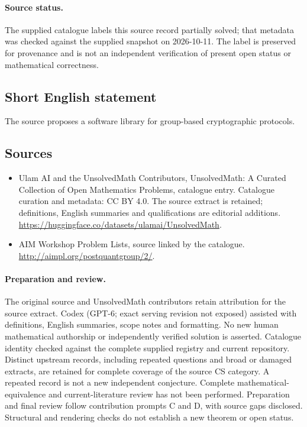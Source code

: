\documentclass[11pt]{article}
\begin{document}
\paragraph{Source status.}
The supplied catalogue labels this source record partially solved; that metadata was checked against the supplied snapshot on 2026-10-11. The label is preserved for provenance and is not an independent verification of present open status or mathematical correctness.
\subsection{Short English statement}
The source proposes a software library for group-based cryptographic protocols.
\subsection{Sources}
\begin{itemize}
\item[\hypertarget{source:statement:1}{S1}] Ulam AI and the UnsolvedMath Contributors, UnsolvedMath: A Curated Collection of Open Mathematics Problems, catalogue entry. Catalogue curation and metadata: CC BY 4.0. The source extract is retained; definitions, English summaries and qualifications are editorial additions.
\url{https://huggingface.co/datasets/ulamai/UnsolvedMath}.
\item[\hypertarget{source:statement:2}{S2}] AIM Workshop Problem Lists, source linked by the catalogue.
\url{http://aimpl.org/postquantgroup/2/}.
\end{itemize}
\paragraph{Preparation and review.}
The original source and UnsolvedMath contributors retain attribution for the source extract. Codex (GPT-6; exact serving revision not exposed) assisted with definitions, English summaries, scope notes and formatting. No new human mathematical authorship or independently verified solution is asserted. Catalogue identity checked against the complete supplied registry and current repository. Distinct upstream records, including repeated questions and broad or damaged extracts, are retained for complete coverage of the source CS category. A repeated record is not a new independent conjecture. Complete mathematical-equivalence and current-literature review has not been performed. Preparation and final review follow contribution prompts C and D, with source gaps disclosed. Structural and rendering checks do not establish a new theorem or open status.
\label{end:statement}
\end{document}
